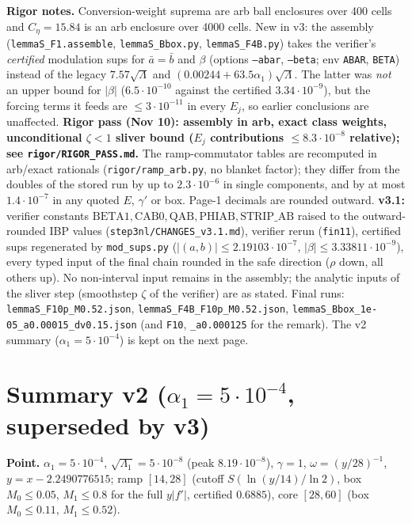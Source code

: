 \documentclass[11pt]{article}
\begin{document}
\noindent\textbf{Rigor notes.} Conversion-weight suprema are arb ball enclosures over 400 cells and $C_\eta=15.84$ is an arb enclosure over 4000 cells. New in v3: the assembly (\texttt{lemmaS\_F1.assemble}, \texttt{lemmaS\_Bbox.py}, \texttt{lemmaS\_F4B.py}) takes the verifier's \emph{certified} modulation sups for $\bar a=\bar b$ and $\beta$ (options \texttt{--abar}, \texttt{--beta}; env \texttt{ABAR}, \texttt{BETA}) instead of the legacy $7.57\sqrt\Lambda$ and $(0.00244+63.5\alpha_1)\sqrt\Lambda$. The latter was \emph{not} an upper bound for $|\beta|$ ($6.5\cdot10^{-10}$ against the certified $3.34\cdot10^{-9}$), but the forcing terms it feeds are $\le3\cdot10^{-11}$ in every $E_j$, so earlier conclusions are unaffected. \textbf{Rigor pass (Nov 10): assembly in arb, exact class weights, unconditional $\zeta<1$ sliver bound ($E_j$ contributions $\le8.3\cdot10^{-8}$ relative); see \texttt{rigor/RIGOR\_PASS.md}.} The ramp-commutator tables are recomputed in arb/exact rationals (\texttt{rigor/ramp\_arb.py}, no blanket factor); they differ from the doubles of the stored run by up to $2.3\cdot10^{-6}$ in single components, and by at most $1.4\cdot10^{-7}$ in any quoted $E$, $\gamma'$ or box. Page-1 decimals are rounded outward. \textbf{v3.1:} verifier constants $\mathrm{BETA1},\mathrm{CAB0},\mathrm{QAB},\mathrm{PHIAB},\mathrm{STRIP\_AB}$ raised to the outward-rounded IBP values (\texttt{step3nl/CHANGES\_v3.1.md}), verifier rerun (\texttt{fin11}), certified sups regenerated by \texttt{mod\_sups.py} ($|(a,b)|\le2.19103\cdot10^{-7}$, $|\beta|\le3.33811\cdot10^{-9}$), every typed input of the final chain rounded in the safe direction ($\rho$ down, all others up). No non-interval input remains in the assembly; the analytic inputs of the sliver step (smoothstep $\zeta$ of the verifier) are as stated. Final runs: \texttt{lemmaS\_F10p\_M0.52.json}, \texttt{lemmaS\_F4B\_F10p\_M0.52.json}, \texttt{lemmaS\_Bbox\_1e-05\_a0.00015\_dv0.15.json} (and \texttt{F10}, \texttt{\_a0.000125} for the remark). The v2 summary ($\alpha_1=5\cdot10^{-4}$) is kept on the next page.
\normalsize\newpage
\section*{Summary v2 ($\alpha_1=5\cdot10^{-4}$, superseded by v3)}
\scriptsize\noindent\textbf{Point.} $\alpha_1=5\cdot10^{-4}$, $\sqrt{\Lambda_1}=5\cdot10^{-8}$ (peak $8.19\cdot10^{-8}$), $\gamma=1$, $\omega=(y/28)^{-1}$, $y=x-2.2490776515$; ramp $[14,28]$ (cutoff $S(\ln(y/14)/\ln2)$, box $M_0\le0.05$, $M_1\le0.8$ for the full $y|f'|$, certified $0.6885$), core $[28,60]$ (box $M_0\le0.11$, $M_1\le0.52$).
\end{document}
